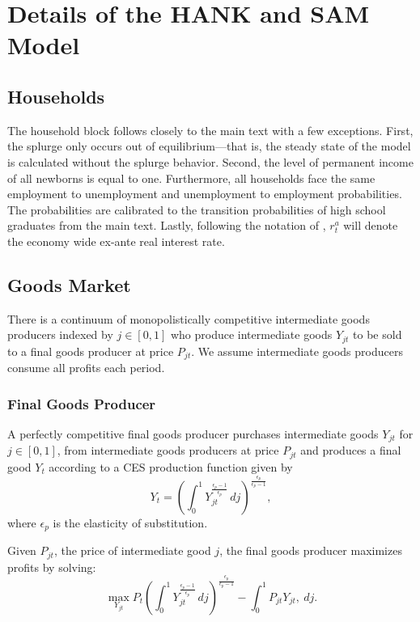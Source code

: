 \documentclass[\econtexRoot/HAFiscal]{subfiles}
\begin{document}
	
\FloatBarrier
\hypertarget{hank_appendix}{}\par\section{Details of the HANK and SAM Model}
\notinsubfile{\label{sec:hank_appendix}}


\subsection{Households}

The household block follows closely to the main text with a few exceptions. First, the splurge only occurs out of equilibrium---that is, the steady state of the model is calculated without the splurge behavior. Second, the level of permanent income of all newborns is equal to one. Furthermore, all households face the same employment to unemployment and unemployment to employment probabilities. The probabilities are calibrated to the transition probabilities of high school graduates from the main text. Lastly, following the notation of \cite{Auclert2020}, $r^{a}_{t}$ will denote the economy wide ex-ante real interest rate.


\subsection{Goods Market}

There is a continuum of  monopolistically competitive intermediate goods producers indexed by $j \in [0,1]$ who produce intermediate goods $Y_{jt}$ to be sold to a final goods producer at price $P_{jt}$. We assume intermediate goods producers consume all profits each period.  

\subsubsection{Final Goods Producer}

A perfectly competitive final goods producer purchases intermediate goods $Y_{jt}$ for $j \in [0,1]$, from intermediate goods producers at price $P_{jt}$ and produces a final good $Y_{t}$ according to a CES production function given by 
$$ Y_{t} = \left(\int_{0}^{1} Y_{jt}^{\frac{\epsilon_{p}-1}{\epsilon_{p}}}\, dj\right)^{\frac{\epsilon_{p}}{\epsilon_{p}-1}},$$ 
where $\epsilon_{p}$ is the elasticity of substitution.

Given $P_{jt}$, the price of intermediate good $j$, the final goods producer maximizes profits by solving:
$$ \max_{Y_{jt}} P_{t} \left(\int_{0}^{1} Y_{jt}^{\frac{\epsilon_{p}-1}{\epsilon_{p}}}\, dj\right)^{\frac{\epsilon_{p}}{\epsilon_{p}-1}} - \int_{0}^{1} P_{jt} Y_{jt} ,\ dj.$$ 
\end{document}
